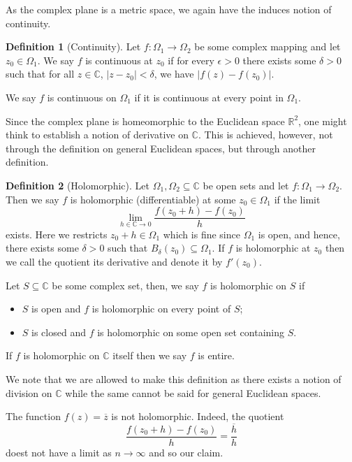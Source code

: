 \documentclass[
]{article}
\theoremstyle{definition}
\theoremstyle{definition}
\newtheorem{definition}{Definition}[section]
\begin{document}
As the complex plane is a metric space, we again have the induces notion
of continuity.

\begin{definition}[Continuity]
  Let \(f : \Omega_1 \to \Omega_2\) be some complex mapping and let \(z_0 \in \Omega_1\). 
  We say \(f\) is continuous at \(z_0\) if for every \(\epsilon > 0\) there exists 
  some \(\delta >0\) such that for all \(z \in \mathbb{C}\), 
  \(\left| z - z_0 \right| < \delta\), we have \(\left| f(z) - f(z_0) \right|\).

  We say \(f\) is continuous on \(\Omega_1\) if it is continuous at every point 
  in \(\Omega_1\).
\end{definition}

Since the complex plane is homeomorphic to the Euclidean space
\(\mathbb{R}^2\), one might think to establish a notion of derivative on
\(\mathbb{C}\). This is achieved, however, not through the definition on
general Euclidean spaces, but through another definition.

\begin{definition}[Holomorphic]
  Let \(\Omega_1, \Omega_2 \subseteq \mathbb{C}\) be open sets and let 
  \(f : \Omega_1 \to \Omega_2\). Then we say \(f\) is holomorphic (differentiable) 
  at some \(z_0 \in \Omega_1\) if the limit 
  \[\lim_{h \in \mathbb{C} \to 0} \frac{f(z_0 + h) - f(z_0)}{h}\]
  exists. Here we restricts \(z_0 + h \in \Omega_1\) which is fine since \(\Omega_1\) 
  is open, and hence, there exists some \(\delta > 0\) such that 
  \(B_\delta(z_0) \subseteq \Omega_1\). If \(f\) is holomorphic at \(z_0\) then 
  we call the quotient its derivative and denote it by \(f'(z_0)\). 
  
  Let \(S \subseteq \mathbb{C}\) be some complex set, then, we say \(f\) is 
  holomorphic on \(S\) if 
  \begin{itemize}
    \item \(S\) is open and \(f\) is holomorphic on every point of \(S\);
    \item \(S\) is closed and \(f\) is holomorphic on some open set containing \(S\).
  \end{itemize}
  If \(f\) is holomorphic on \(\mathbb{C}\) itself then we say \(f\) is entire.
\end{definition}

We note that we are allowed to make this definition as there exists a
notion of division on \(\mathbb{C}\) while the same cannot be said for
general Euclidean spaces.

The function \(f(z) = \overline{z}\) is not holomorphic. Indeed, the
quotient \[\frac{f(z_0 + h) - f(z_0)}{h} = \frac{\overline{h}}{h}\]
doest not have a limit as \(n \to \infty\) and so our claim.
\end{document}
